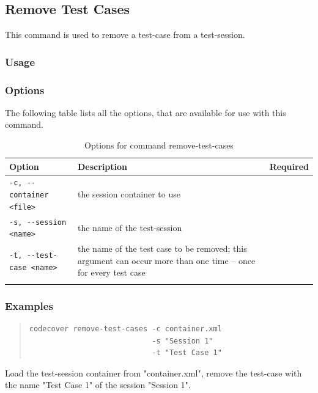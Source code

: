 \subsection{Remove Test Cases}\label{Command-Remove-Test-Cases}
This command is used to remove a test-case from a test-session.
\subsubsection{Usage}\label{command:rt:usage}
\begin{quote}
\end{quote}

\subsubsection{Options}\label{command:rt:options}
The following table lists all the options, that are available for use with this command.
\begin{longtable}{|l|p{4cm}|c|}\hline
   {\textbf{Option}} & 
   {\textbf{Description}} & 
   {\textbf{Required}} \\\hline \hline \endhead
   \verb$-c, --container <file>$ & the session container to use & \x \\\hline
   \verb$-s, --session <name>$ & the name of the test-session & \x \\\hline
   \verb$-t, --test-case <name>$ & the name of the test case to be removed; this argument can occur more than one time -- once for every test case & \x \\\hline
  \caption{Options for command remove-test-cases}
  \label{fr_tb:Options for command remove-test-cases}
\end{longtable}

\subsubsection{Examples}\label{command:rt:examples}
\begin{quote}
\begin{verbatim}
codecover remove-test-cases -c container.xml 
                            -s "Session 1"
                            -t "Test Case 1"
\end{verbatim}
\end{quote}
Load the test-session container from "container.xml", remove the test-case with the name "Test Case 1" of the session "Session 1".

